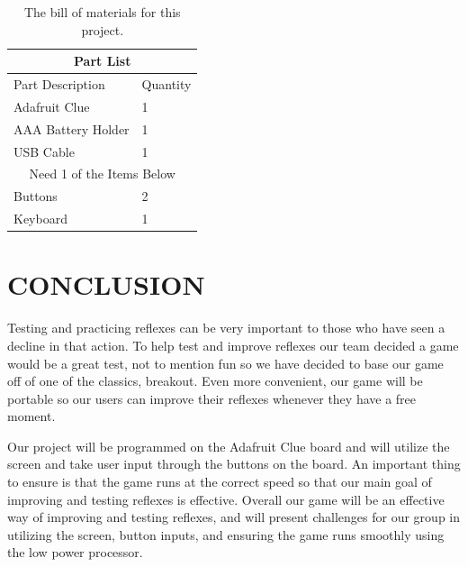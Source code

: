 \documentclass[12pt]{article}
\begin{document}
\begin{table}
\centering
\begin{tabular}{ |p{4cm}|p{1.5cm}|}
\hline
\multicolumn{2}{|c|}{Part List} \\
\hline
Part Description& Quantity \\
\hline
Adafruit Clue & 1 \\
AAA Battery Holder & 1 \\
USB Cable &1 \\
\hline
\multicolumn{2}{|c|}{Need 1 of the Items Below} \\
\hline
Buttons & 2 \\
Keyboard & 1 \\
\hline
\end{tabular}
\caption{The bill of materials for this project.}
\label{table:BOM}
\end{table}










\section{CONCLUSION}
Testing and practicing reflexes can be very important to those who have seen a decline in that action. To help test and improve reflexes our team decided a game would be a great test, not to mention fun so we have decided to base our game off of one of the classics, breakout. Even more convenient, our game will be portable so our users can improve their reflexes whenever they have a free moment. 

Our project will be programmed on the Adafruit Clue board and will utilize the screen and take user input through the buttons on the board. An important thing to ensure is that the game runs at the correct speed so that our main goal of improving and testing reflexes is effective. Overall our game will be an effective way of improving and testing reflexes, and will present challenges for our group in utilizing the screen, button inputs, and ensuring the game runs smoothly using the low power processor.


\newpage
\printbibliography
%
%
\end{document}
